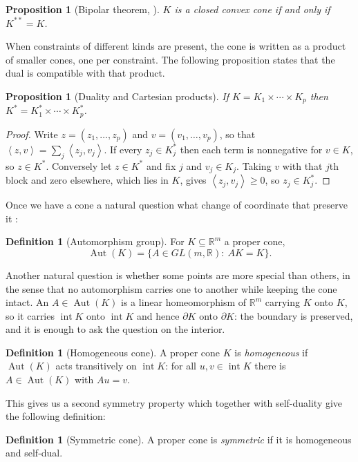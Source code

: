 \documentclass[a4paper,11pt]{book}
\theoremstyle{plain}
\newtheorem{proposition}[theorem]{Proposition}
\theoremstyle{definition}
\newtheorem{definition}[theorem]{Definition}
\theoremstyle{remark}
\numberwithin{equation}{chapter}
\numberwithin{algorithm}{chapter}
\newcommand{\R}{\mathbb{R}}
\newcommand{\inner}[2]{\left\langle #1, #2 \right\rangle}
\newcommand{\intr}{\operatorname{int}}
\newcommand{\Aut}{\operatorname{Aut}}
\begin{document}
	
	\begin{proposition}[Bipolar theorem, \cite{Rockafellar1970}]
		$K$ is a closed convex cone if and only if $K^{**}=K$.
	\end{proposition}
	
	
	When constraints of different kinds are present, the cone is written as a
	product of smaller cones, one per constraint. The following proposition states
	that the dual is compatible with that product.
	
	\begin{proposition}[Duality and Cartesian products]
		If $K=K_1\times\cdots\times K_p$ then
		$K^*=K_1^*\times\cdots\times K_p^*$.
	\end{proposition}
	
	\begin{proof}
		Write $z=(z_1,\dots,z_p)$ and $v=(v_1,\dots,v_p)$, so that
		$\inner{z}{v}=\sum_j\inner{z_j}{v_j}$. If every $z_j\in K_j^*$ then each term
		is nonnegative for $v\in K$, so $z\in K^*$. Conversely let $z\in K^*$ and fix
		$j$ and $v_j\in K_j$. Taking $v$ with that $j$th block and zero elsewhere,
		which lies in $K$, gives $\inner{z_j}{v_j}\geq0$, so $z_j\in K_j^*$.
	\end{proof}
	
	Once we have a cone a natural question what change of coordinate that preserve it :
	\begin{definition}[Automorphism group]
		For $K\subseteq\R^m$ a proper cone,
		\begin{equation}
			\Aut(K)=\{A\in GL(m,\R):\ AK=K\} .
		\end{equation}
	\end{definition}
	
	Another natural question is whether some points are more special than others,
	in the sense that no automorphism carries one to another while keeping the cone
	intact. An $A\in\Aut(K)$ is a linear homeomorphism of $\R^m$ carrying $K$ onto
	$K$, so it carries $\intr K$ onto $\intr K$ and hence $\partial K$ onto
	$\partial K$: the boundary is preserved, and it is enough to ask the question on
	the interior.
	
	\begin{definition}[Homogeneous cone]
		A proper cone $K$ is \emph{homogeneous} if $\Aut(K)$ acts transitively on
		$\intr K$: for all $u,v\in\intr K$ there is $A\in\Aut(K)$ with $Au=v$.
	\end{definition}
	
	This gives us a second symmetry property which together with self-duality give the following definition: 
	\begin{definition}[Symmetric cone]
		A proper cone is \emph{symmetric} if it is homogeneous and self-dual.
	\end{definition}
	
\end{document}
